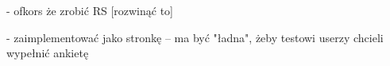 \documentclass[12pt]{report}
\begin{document}
- ofkors że zrobić RS [rozwinąć to]

- zaimplementować jako stronkę
    -- ma być "ładna", żeby testowi userzy chcieli wypełnić ankietę


\end{document}
